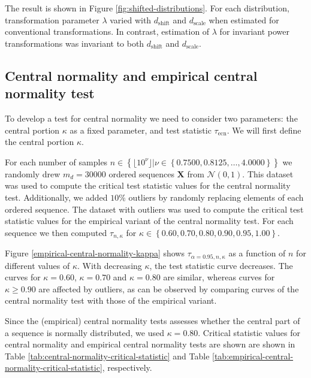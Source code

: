 \documentclass[
  a4paper,
]{article}
\begin{document}
The result is shown in Figure \ref{fig:shifted-distributions}. For each
distribution, transformation parameter \(\lambda\) varied with
\(d_{\text{shift}}\) and \(d_{\text{scale}}\) when estimated for
conventional transformations. In contrast, estimation of \(\lambda\) for
invariant power transformations was invariant to both
\(d_{\text{shift}}\) and \(d_{\text{scale}}\).

\subsection{Central normality and empirical central normality
test}\label{central-normality-and-empirical-central-normality-test}

To develop a test for central normality we need to consider two
parameters: the central portion \(\kappa\) as a fixed parameter, and
test statistic \(\tau_{\text{ecn}}\). We will first define the central
portion \(\kappa\).

For each number of samples
\(n \in \left\{\lfloor 10^\nu \rfloor | \nu \in \left\{0.7500, 0.8125, \ldots, 4.0000 \right \} \right\}\)
we randomly drew \(m_d = 30000\) ordered sequences \(\mathbf{X}\) from
\(\mathcal{N}(0,1)\). This dataset was used to compute the critical test
statistic values for the central normality test. Additionally, we added
\(10 \%\) outliers by randomly replacing elements of each ordered
sequence. The dataset with outliers was used to compute the critical
test statistic values for the empirical variant of the central normality
test. For each sequence we then computed \(\tau_{n, \kappa}\) for
\(\kappa \in \left\{0.60, 0.70, 0.80, 0.90, 0.95, 1.00\right\}\).

Figure \ref{empirical-central-normality-kappa} shows
\(\tau_{\alpha = 0.95, n, \kappa}\) as a function of \(n\) for different
values of \(\kappa\). With decreasing \(\kappa\), the test statistic
curve decreases. The curves for \(\kappa = 0.60\), \(\kappa = 0.70\) and
\(\kappa = 0.80\) are similar, whereas curves for \(\kappa \geq 0.90\)
are affected by outliers, as can be observed by comparing curves of the
central normality test with those of the empirical variant.

Since the (empirical) central normality tests assesses whether the
central part of a sequence is normally distributed, we used
\(\kappa = 0.80\). Critical statistic values for central normality and
empirical central normality tests are shown are shown in Table
\ref{tab:central-normality-critical-statistic} and Table
\ref{tab:empirical-central-normality-critical-statistic}, respectively.
\end{document}
